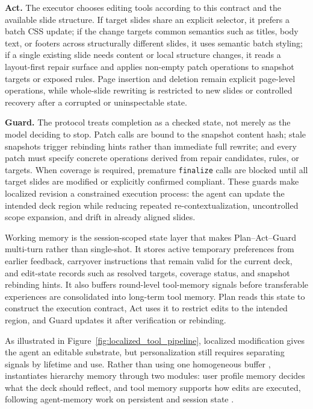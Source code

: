 \textbf{Act.} The executor chooses editing tools according to this contract and
the available slide structure. If target slides share an explicit selector, it
prefers a batch CSS update; if the change targets common semantics such as
titles, body text, or footers across structurally different slides, it uses
semantic batch styling; if a single existing slide needs content or local
structure changes, it reads a layout-first repair surface and applies
non-empty patch operations to snapshot targets or exposed rules. Page insertion
and deletion remain explicit page-level operations, while whole-slide rewriting
is restricted to new slides or controlled recovery after a corrupted or
uninspectable state.

\textbf{Guard.} The protocol treats completion as a checked state, not merely as
the model deciding to stop. Patch calls are bound to the snapshot content hash;
stale snapshots trigger rebinding hints rather than immediate full rewrite; and
every patch must specify concrete operations derived from repair candidates,
rules, or targets. When coverage is required, premature \texttt{finalize} calls
are blocked until all target slides are modified or explicitly confirmed
compliant. These guards make localized revision a constrained execution process:
the agent can update the intended deck region while reducing repeated
re-contextualization, uncontrolled scope expansion, and drift in already aligned
slides.

Working memory is the session-scoped state layer that makes
Plan--Act--Guard multi-turn rather than single-shot. It stores active temporary
preferences from earlier feedback, carryover instructions that remain valid for
the current deck, and edit-state records such as resolved targets, coverage
status, and snapshot rebinding hints. It also buffers round-level tool-memory
signals before transferable experiences are consolidated into long-term tool
memory. Plan reads this state to construct the execution contract, Act uses it
to restrict edits to the intended region, and Guard updates it after
verification or rebinding.



As illustrated in Figure~\ref{fig:localized_tool_pipeline}, localized
modification gives the agent an editable substrate, but personalization still requires separating signals by lifetime and use. Rather
than using one homogeneous buffer
\citep{lewis2020rag,guu2020realm,khandelwal2019knnlm,borgeaud2021retro,izacard2022atlas,wang2023longmem},
\methodname instantiates hierarchy memory through two modules: user profile
memory decides what the deck should reflect, and tool memory supports how edits
are executed, following agent-memory work on persistent and session state
\citep{zhong2023memorybank,packer2023memgpt,park2023generativeagents,xu2025amem,chhikara2025mem0,wang2025mirix,kang2025memoryos,wu2025memoryage,yu2026agemem}.

